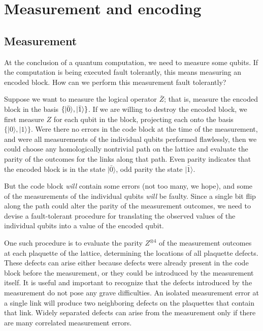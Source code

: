 \section{Measurement and encoding}
\label{sec:enc_meas}

\subsection{Measurement}
\label{subsec:measurement}

At the conclusion of a quantum computation, we need to measure some qubits. If
the computation is being executed fault tolerantly, this means measuring an
encoded block.  How can we perform this measurement fault tolerantly?

Suppose we want to measure the logical operator $\bar Z$; that is, measure the
encoded block in the basis $\{|{\bar 0}\rangle,|{\bar 1}\rangle\}$. If we are willing
to destroy the encoded block, we first measure $Z$ for each qubit in the block,
projecting each onto the basis $\{|0\rangle, |1\rangle\}$. Were there no errors
in the code block at the time of the measurement, and were all measurements of
the individual qubits performed flawlessly, then we could choose any
homologically nontrivial path on the lattice and evaluate the parity of the
outcomes for the links along that path.  Even parity indicates that the encoded
block is in the state $|\bar 0\rangle$, odd parity the state $|\bar 1\rangle$.

But the code block {\em will} contain some errors (not too many, we hope), and
some of the measurements of the individual qubits {\em will} be faulty. Since a
single bit flip along the path could alter the parity of the measurement
outcomes, we need to devise a fault-tolerant procedure for translating the
observed values of the individual qubits into a value of the encoded qubit.

One such procedure is to evaluate the parity $Z^{\otimes 4}$ of the measurement outcomes
at each plaquette of the lattice, determining the locations of all
plaquette defects. These defects can arise either because defects were already
present in the code block before the measurement, or they could be introduced
by the measurement itself.  It is useful and important to recognize that the
defects introduced by the measurement do not pose any grave difficulties.   An
isolated measurement error at a single link will produce two neighboring
defects on the pla\-quettes that contain that link.  Widely separated defects can
arise from the measurement only if there are many correlated measurement
errors.

